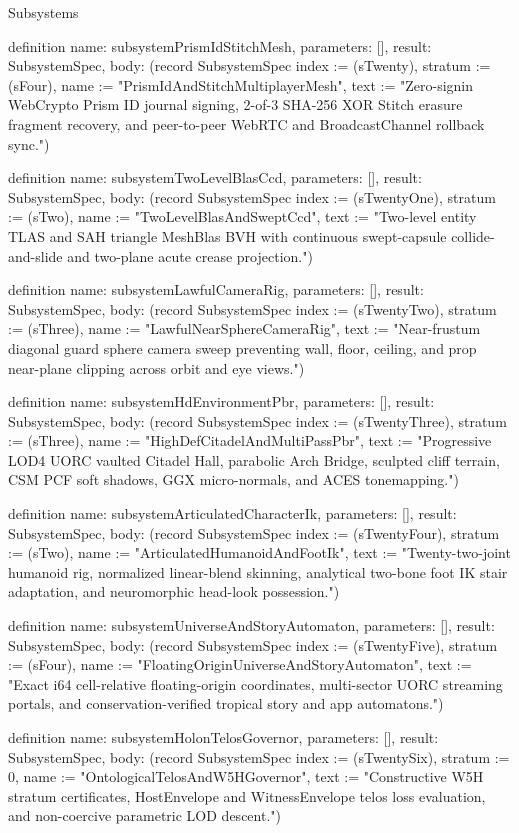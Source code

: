 \begin{lexlean}{Subsystems}
\begin{semanticmodule}
definition{
  name: subsystemPrismIdStitchMesh,
  parameters: [],
  result: SubsystemSpec,
  body: (record SubsystemSpec {index := (sTwenty), stratum := (sFour), name := "PrismIdAndStitchMultiplayerMesh", text := "Zero-signin WebCrypto Prism ID journal signing, 2-of-3 SHA-256 XOR Stitch erasure fragment recovery, and peer-to-peer WebRTC and BroadcastChannel rollback sync."})
}

definition{
  name: subsystemTwoLevelBlasCcd,
  parameters: [],
  result: SubsystemSpec,
  body: (record SubsystemSpec {index := (sTwentyOne), stratum := (sTwo), name := "TwoLevelBlasAndSweptCcd", text := "Two-level entity TLAS and SAH triangle MeshBlas BVH with continuous swept-capsule collide-and-slide and two-plane acute crease projection."})
}

definition{
  name: subsystemLawfulCameraRig,
  parameters: [],
  result: SubsystemSpec,
  body: (record SubsystemSpec {index := (sTwentyTwo), stratum := (sThree), name := "LawfulNearSphereCameraRig", text := "Near-frustum diagonal guard sphere camera sweep preventing wall, floor, ceiling, and prop near-plane clipping across orbit and eye views."})
}

definition{
  name: subsystemHdEnvironmentPbr,
  parameters: [],
  result: SubsystemSpec,
  body: (record SubsystemSpec {index := (sTwentyThree), stratum := (sThree), name := "HighDefCitadelAndMultiPassPbr", text := "Progressive LOD4 UORC vaulted Citadel Hall, parabolic Arch Bridge, sculpted cliff terrain, CSM PCF soft shadows, GGX micro-normals, and ACES tonemapping."})
}

definition{
  name: subsystemArticulatedCharacterIk,
  parameters: [],
  result: SubsystemSpec,
  body: (record SubsystemSpec {index := (sTwentyFour), stratum := (sTwo), name := "ArticulatedHumanoidAndFootIk", text := "Twenty-two-joint humanoid rig, normalized linear-blend skinning, analytical two-bone foot IK stair adaptation, and neuromorphic head-look possession."})
}

definition{
  name: subsystemUniverseAndStoryAutomaton,
  parameters: [],
  result: SubsystemSpec,
  body: (record SubsystemSpec {index := (sTwentyFive), stratum := (sFour), name := "FloatingOriginUniverseAndStoryAutomaton", text := "Exact i64 cell-relative floating-origin coordinates, multi-sector UORC streaming portals, and conservation-verified tropical story and app automatons."})
}

definition{
  name: subsystemHolonTelosGovernor,
  parameters: [],
  result: SubsystemSpec,
  body: (record SubsystemSpec {index := (sTwentySix), stratum := 0, name := "OntologicalTelosAndW5HGovernor", text := "Constructive W5H stratum certificates, HostEnvelope and WitnessEnvelope telos loss evaluation, and non-coercive parametric LOD descent."})
}


\end{semanticmodule}
\end{lexlean}
